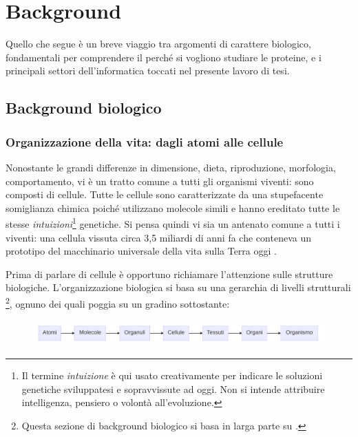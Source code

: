 \chapter{Background}

Quello che segue è un breve viaggio tra argomenti di carattere biologico, fondamentali per comprendere il perché si vogliono studiare le proteine, e i principali settori dell'informatica toccati nel presente lavoro di tesi.

\section{Background biologico}


\subsection{Organizzazione della vita: dagli atomi alle cellule}
Nonostante le grandi differenze in dimensione, dieta, riproduzione, morfologia, comportamento, vi è un tratto comune a tutti gli organismi viventi: sono composti di cellule. Tutte le cellule sono caratterizzate da una stupefacente somiglianza chimica poiché utilizzano molecole simili e hanno ereditato tutte le stesse \textit{intuizioni}\footnote{Il termine \textit{intuizione} è qui usato creativamente per indicare le soluzioni genetiche sviluppatesi e sopravvissute ad oggi. Non si intende attribuire intelligenza, pensiero o volontà all'evoluzione.} genetiche. Si pensa quindi vi sia un antenato comune a tutti i viventi: una cellula vissuta circa 3,5 miliardi di anni fa che conteneva un prototipo del macchinario universale della vita sulla Terra oggi \supercite{alberts2018essential}. \\

\par Prima di parlare di cellule è opportuno richiamare l'attenzione sulle strutture biologiche. L'organizzazione biologica si basa su una gerarchia di livelli strutturali \footnote{Questa sezione di background biologico si basa in larga parte su .}, ognuno dei quali poggia su un gradino sottostante: 

\begin{figure}[h]
	\centering
	\includegraphics[scale=0.45] {images/strutture_biologiche.png}
\end{figure}


